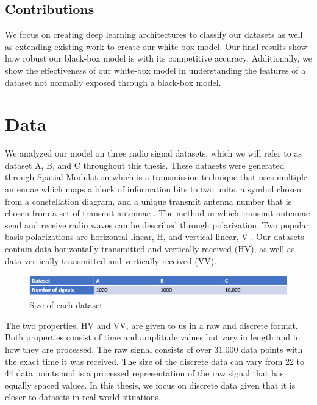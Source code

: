 \documentclass{turabian-thesis}
\begin{document}
\section{Contributions}
We focus on creating deep learning architectures to classify our datasets as well as extending existing work to create our white-box model. Our final results show how robust our black-box model is with its competitive accuracy. Additionally, we show the effectiveness of our white-box model in understanding the features of a dataset not normally exposed through a black-box model.


\chapter{Data}

We analyzed our model on three radio signal datasets, which we will refer to as dataset A, B, and C throughout this thesis. These datasets were generated through Spatial Modulation which is a transmission technique that uses multiple antennae which maps a block of information bits to two units, a symbol chosen from a constellation diagram, and a unique transmit antenna number that is chosen from a set of transmit antennae \cite{mesleh_spatial_2008}. The method in which transmit antennae send and receive radio waves can be described through polarization. Two popular basis polarizations are horizontal linear, H, and vertical linear, V \cite{oshea_convolutional_2016}. Our datasets contain data horizontally transmitted and vertically received (HV), as well as data vertically transmitted and vertically received (VV).

\begin{figure}[h!]
   \begin{center}
      \includegraphics[scale=0.5]{../media/dataset_info.png}
   \end{center}
   \caption{Size of each dataset.}
   \label{fig:dataset_info}
\end{figure}

The two properties, HV and VV, are given to us in a raw and discrete format. Both properties consist of time and amplitude values but vary in length and in how they are processed. The raw signal consists of over 31,000 data points with the exact time it was received. The size of the discrete data can vary from 22 to 44 data points and is a processed representation of the raw signal that has equally spaced values. In this thesis, we focus on discrete data given that it is closer to datasets in real-world situations.
\end{document}
